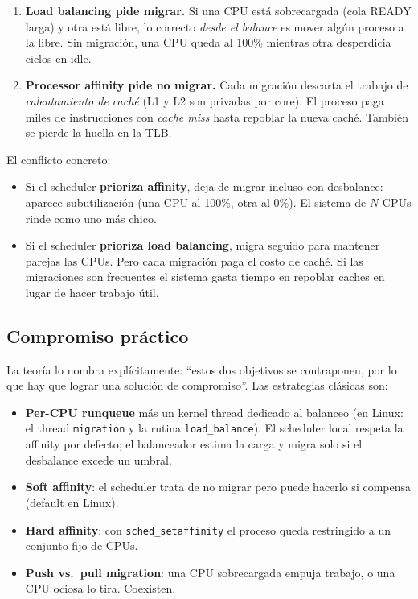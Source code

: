 \documentclass[11pt,a4paper]{article}
\begin{document}
\begin{enumerate}[leftmargin=*,nosep]
    \item \textbf{Load balancing pide migrar.} Si una CPU está
        sobrecargada (cola READY larga) y otra está libre, lo correcto
        \emph{desde el balance} es mover algún proceso a la libre.
        Sin migración, una CPU queda al 100\% mientras otra
        desperdicia ciclos en idle.
    \item \textbf{Processor affinity pide no migrar.} Cada migración
        descarta el trabajo de \emph{calentamiento de caché} (L1 y L2
        son privadas por core). El proceso paga miles de instrucciones
        con \emph{cache miss} hasta repoblar la nueva caché. También
        se pierde la huella en la TLB.
\end{enumerate}

El conflicto concreto:

\begin{itemize}[leftmargin=*,nosep]
    \item Si el scheduler \textbf{prioriza affinity}, deja de migrar
        incluso con desbalance: aparece subutilización (una CPU al
        100\%, otra al 0\%). El sistema de $N$ CPUs rinde como uno
        más chico.
    \item Si el scheduler \textbf{prioriza load balancing}, migra
        seguido para mantener parejas las CPUs. Pero cada migración
        paga el costo de caché. Si las migraciones son frecuentes el
        sistema gasta tiempo en repoblar caches en lugar de hacer
        trabajo útil.
\end{itemize}

\subsection*{Compromiso práctico}

La teoría lo nombra explícitamente: ``estos dos objetivos se
contraponen, por lo que hay que lograr una solución de
compromiso''. Las estrategias clásicas son:

\begin{itemize}[leftmargin=*,nosep]
    \item \textbf{Per-CPU runqueue} más un kernel thread dedicado al
        balanceo (en Linux: el thread \texttt{migration} y la rutina
        \texttt{load\_balance}). El scheduler local respeta la
        affinity por defecto; el balanceador estima la carga y
        migra solo si el desbalance excede un umbral.
    \item \textbf{Soft affinity}: el scheduler trata de no migrar
        pero puede hacerlo si compensa (default en Linux).
    \item \textbf{Hard affinity}: con \texttt{sched\_setaffinity} el
        proceso queda restringido a un conjunto fijo de CPUs.
    \item \textbf{Push vs.\ pull migration}: una CPU sobrecargada
        empuja trabajo, o una CPU ociosa lo tira. Coexisten.
\end{itemize}
\end{document}
